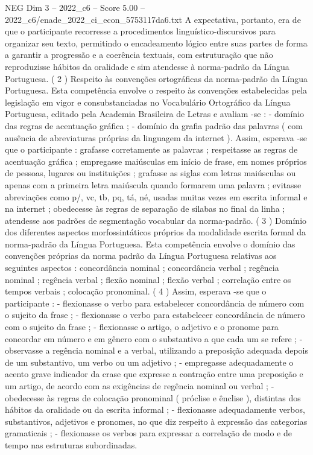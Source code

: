 \begin{textsample}{NEG Dim 3 – 2022\_c6 – Score 5.00 – 2022\_c6/enade\_2022\_ci\_econ\_5753117da6.txt}
A expectativa, portanto, era de que o participante recorresse a procedimentos linguístico-discursivos para organizar seu texto, permitindo o encadeamento lógico entre suas partes de forma a garantir a progressão e a coerência textuais, com estruturação que não reproduzisse hábitos da oralidade e sim atendesse à norma-padrão da Língua Portuguesa. ( 2 ) Respeito às convenções ortográficas da norma-padrão da Língua Portuguesa.
Esta competência envolve o respeito às convenções estabelecidas pela legislação em vigor e consubstanciadas no Vocabulário Ortográfico da Língua Portuguesa, editado pela Academia Brasileira de Letras e avaliam -se : - domínio das regras de acentuação gráfica ; - domínio da grafia padrão das palavras ( com ausência de abreviaturas próprias da linguagem da internet ).
Assim, esperava -se que o participante : grafasse corretamente as palavras ; respeitasse as regras de acentuação gráfica ; empregasse maiúsculas em início de frase, em nomes próprios de pessoas, lugares ou instituições ; grafasse as siglas com letras maiúsculas ou apenas com a primeira letra maiúscula quando formarem uma palavra ; evitasse abreviações como p/, vc, tb, pq, tá, né, usadas muitas vezes em escrita informal e na internet ; obedecesse às regras de separação de sílabas no final da linha ; atendesse aos padrões de segmentação vocabular da norma-padrão. ( 3 ) Domínio dos diferentes aspectos morfossintáticos próprios da modalidade escrita formal da norma-padrão da Língua Portuguesa.
Esta competência envolve o domínio das convenções próprias da norma padrão da Língua Portuguesa relativas aos seguintes aspectos : concordância nominal ; concordância verbal ; regência nominal ; regência verbal ; flexão nominal ; flexão verbal ; correlação entre os tempos verbais ; colocação pronominal. ( 4 ) Assim, esperava -se que o participante : - flexionasse o verbo para estabelecer concordância de número com o sujeito da frase ; - flexionasse o verbo para estabelecer concordância de número com o sujeito da frase ; - flexionasse o artigo, o adjetivo e o pronome para concordar em número e em gênero com o substantivo a que cada um se refere ; - observasse a regência nominal e a verbal, utilizando a preposição adequada depois de um substantivo, um verbo ou um adjetivo ; - empregasse adequadamente o acento grave indicador da crase que expresse a contração entre uma preposição e um artigo, de acordo com as exigências de regência nominal ou verbal ; - obedecesse às regras de colocação pronominal ( próclise e ênclise ), distintas dos hábitos da oralidade ou da escrita informal ; - flexionasse adequadamente verbos, substantivos, adjetivos e pronomes, no que diz respeito à expressão das categorias gramaticais ; - flexionasse os verbos para expressar a correlação de modo e de tempo nas estruturas subordinadas.

\end{textsample}
